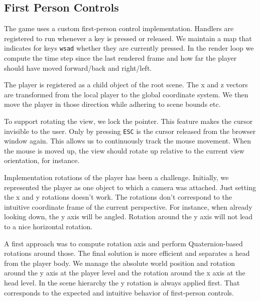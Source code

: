 \documentclass[11pt]{article}
\begin{document}
\subsection{First Person Controls}
\par The game uses a custom first-person control implementation. Handlers are registered to run whenever a key is pressed or released. We maintain a map that indicates for keys \texttt{wsad} whether they are currently pressed. In the render loop we compute the time step since the last rendered frame and how far the player should have moved forward/back and right/left.
\par The player is registered as a child object of the root scene. The x and z vectors are transformed from the local player to the global coordinate system. We then move the player in those direction while adhering to scene bounds etc.
\par To support rotating the view, we lock the pointer. This feature makes the cursor invisible to the user. Only by pressing \texttt{ESC} is the cursor released from the browser window again. This allows us to continuously track the mouse movement. When the mouse is moved up, the view should rotate up relative to the current view orientation, for instance.
\par Implementation rotations of the player has been a challenge. Initially, we represented the player as one object to which a camera was attached. Just setting the x and y rotations doesn't work. The rotations don't correspond to the intuitive coordinate frame of the current perspective. For instance, when already looking down, the y axis will be angled. Rotation around the y axis will not lead to a nice horizontal rotation.
\par A first approach was to compute rotation axis and perform Quaternion-based rotations around those. The final solution is more efficient and separates a head from the player body. We manage the absolute world position and rotation around the y axis at the player level and the rotation around the x axis at the head level. In the scene hierarchy the y rotation is always applied first. That corresponds to the expected and intuitive behavior of first-person controls.
\end{document}
